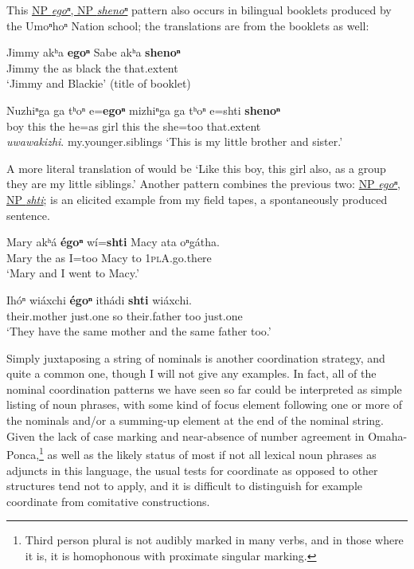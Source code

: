\documentclass[output=paper]{LSP/langsci}
\begin{document}
This \underline{NP \textit{egoⁿ}, NP \textit{shenoⁿ}} pattern also occurs in bilingual booklets produced by the Umoⁿhoⁿ Nation school; the translations are from the booklets as well:
	
\begin{exe}	
\ex\label{ex:rudin:25}
\gll Jimmy 	akʰa \textbf{egoⁿ} Sabe akʰa \textbf{shenoⁿ} \\
Jimmy the  	as 	black 	the  	that.extent \\
\trans `Jimmy and Blackie' (title of booklet)

\ex\label{ex:rudin:26} 
\gll Nuzhiⁿga ga tʰoⁿ e=\textbf{egoⁿ} mizhiⁿga ga  tʰoⁿ e=shti 	\textbf{shenoⁿ}  \\
boy 	this 	the 	he=as   	girl   this the she=too  that.extent 	 \\

\textit{uwawakizhi}.
my.younger.siblings
\trans `This is my little brother and sister.' 	
\end{exe}	 
	
A more literal translation of  would be `Like this boy, this girl also, as a group they are my little siblings.' Another pattern combines the previous two:   \underline{NP \textit{egoⁿ}, NP \textit{shti}};  is an elicited example from my field tapes,  a spontaneously produced sentence. 

\begin{exe}	
\ex\label{ex:rudin:27}
\gll Mary akʰá \textbf{égoⁿ}  wí=\textbf{shti} Macy 	ata 	oⁿgátha. \\
Mary the as I=too Macy to 	\textsc{1plA}.go.there \\
\trans`Mary and  I went to Macy.'

\ex\label{ex:rudin:28}
\gll Ihóⁿ  wiáxchi  \textbf{égoⁿ} ithádi  \textbf{shti} wiáxchi. \\
their.mother  just.one so their.father too just.one \\
\trans `They have the same mother and the same father too.'
\end{exe}	

Simply juxtaposing a string of nominals is another coordination strategy, and quite a common one, though I will not give any examples. In fact, all of the nominal coordination patterns we have seen so far could be interpreted as simple listing of noun phrases, with some kind of focus element following one or more of the nominals and/or a summing-up element at the end of the nominal string. Given the lack of case marking and near-absence of number agreement  in Omaha-Ponca,\footnote{Third person plural is not audibly marked in many verbs, and in those where it is, it is homophonous with
proximate singular marking.} as well as the likely status of most if not all lexical noun phrases as adjuncts in this language, the usual tests for coordinate as opposed to other structures tend not to apply, and it is difficult to distinguish for example coordinate from comitative constructions.
\end{document}
